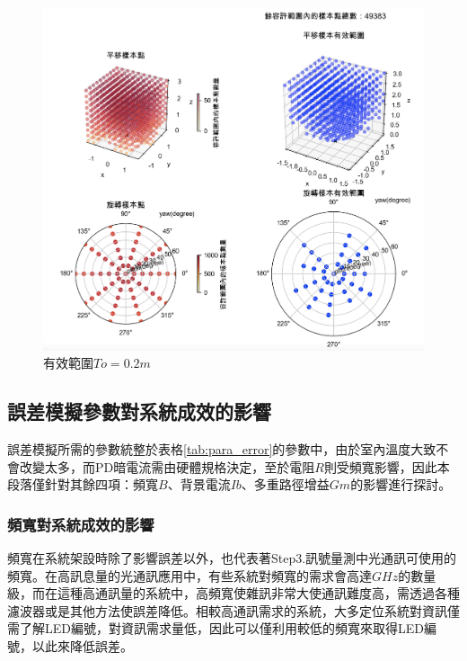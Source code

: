 \begin{figure}[htpb]
    \centering
    \includegraphics[width=15cm]{ch4pic/to02.png}
    \caption{有效範圍$To=0.2m$}
    \label{pic:to02}
\end{figure}










\subsection{誤差模擬參數對系統成效的影響}
\label{chp:effect_error_para}


誤差模擬所需的參數統整於表格\ref{tab:para_error}的參數中，由於室內溫度大致不會改變太多，而PD暗電流需由硬體規格決定，至於電阻$R$則受頻寬影響，因此本段落僅針對其餘四項：頻寬$B$、背景電流$Ib$、多重路徑增益$Gm$的影響進行探討。

    \subsubsection{頻寬對系統成效的影響}
    \label{chp:effect_bandwidth}

    頻寬在系統架設時除了影響誤差以外，也代表著Step3.訊號量測中光通訊可使用的頻寬。在高訊息量的光通訊應用中，有些系統對頻寬的需求會高達$GHz$的數量級，而在這種高通訊量的系統中，高頻寬使雜訊非常大使通訊難度高，需透過各種濾波器或是其他方法使誤差降低。相較高通訊需求的系統，大多定位系統對資訊僅需了解LED編號，對資訊需求量低，因此可以僅利用較低的頻寬來取得LED編號，以此來降低誤差。

